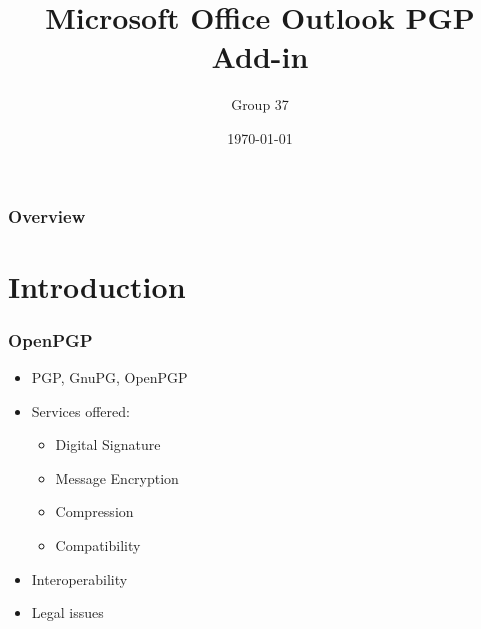 \documentclass{beamer}
\title[Simple PGP]{Microsoft Office Outlook PGP Add-in} %
\author{Group 37} %
\institute[EMDC] %
{
Instituto Superior T\'ecnico \\ %
\medskip
}
\date{\today} %
\begin{document}
\begin{frame}
\titlepage %
\end{frame}

\begin{frame}
\frametitle{Overview} %
\tableofcontents %
\end{frame}


\section{Introduction} %

\begin{frame}
\frametitle{OpenPGP}
\begin{itemize}
\item PGP, GnuPG, OpenPGP
\item Services offered: 
\begin{itemize}
\item Digital Signature
\item Message Encryption
\item Compression
\item Compatibility
\end{itemize}
\item Interoperability
\item Legal issues
\end{itemize}
\end{frame}
\end{document}
